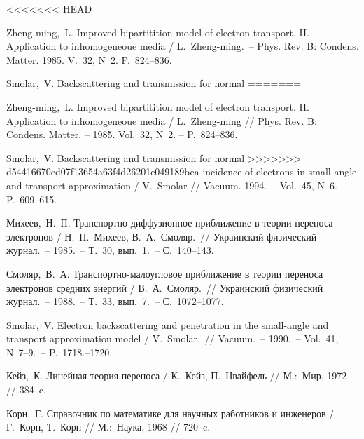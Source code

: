 <<<<<<< HEAD
\def\bibname{СИСОК ИСПОЛЬЗОВАННЫХ ИСТОЧНИКОВ}
\begin{thebibliography}{99}  

 Zheng-ming,~L. Improved bipartitition model of electron
transport. II. Application to inhomogeneoue media / L.~Zheng-ming.~-- Phys. Rev. B:
Condens. Matter. 1985. V.~32, N~2. P.~824--836.

 Smolar,~V. Backscattering and transmission for normal
=======
\def\bibname{СПИСОК ИСПОЛЬЗОВАННЫХ ИСТОЧНИКОВ}
\begin{thebibliography}{99}
\newcommand{\tabfix}{\hspace*{1.5cm}}
 \tabfix Zheng-ming,~L. Improved bipartitition model of electron
transport. II. Application to inhomogeneoue media / L.~Zheng-ming // Phys. Rev. B:
Condens. Matter. -- 1985. Vol.~32, N~2. -- P.~824--836.

 \tabfix Smolar,~V. Backscattering and transmission for normal
>>>>>>> d54416670ed07f13654a63f4d26201e049189bea
incidence of electrons in small-angle and transport approximation /
V.~Smolar // Vacuum. 1994.~-- Vol.~45, N~6.~-- P.~609--615.

 \tabfix Михеев,~Н.~П. Транспортно-диффузионное приближение в теории
переноса электронов / Н.~П.~Михеев, В.~А.~Смоляр.~// Украинский физический
журнал.~-- 1985.~-- Т.~30, вып.~1.~-- С.~140--143.

 \tabfix Смоляр,~В.~А. Транспортно-малоугловое приближение в теории
переноса электронов средних энергий / В.~А.~Смоляр.~// Украинский физический
журнал.~-- 1988.~-- Т.~33, вып.~7.~-- С.~1072--1077.

 \tabfix Smolar,~V. Electron backscattering and penetration in the
small-angle and transport approximation model / V.~Smolar.~// Vacuum.~-- 1990.~--
Vol.~41, N~7--9.~-- P.~1718.--1720.

 \tabfix Кейз,~К. Линейная теория переноса / К.~Кейз, П.~Цвайфель //
М.:~Мир, 1972 // 384~c.

 \tabfix Корн,~Г. Справочник по математике для научных работников и
инженеров /  Г.~Корн, Т.~Корн // М.:~Наука, 1968 // 720~c.



\end{thebibliography}
\end{thebibliography}
